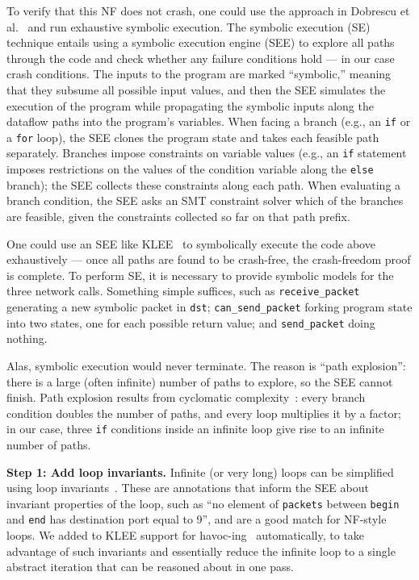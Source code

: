 \documentclass[letterpaper,twocolumn,10pt]{article}
\newcommand{\code}[1]{\lstinline{#1}}
\begin{document}
To verify that this NF does not crash, one could use the approach in Dobrescu et al.~\cite{dobrescu2014software} and run exhaustive symbolic execution. The symbolic execution (SE) technique entails using a symbolic execution engine (SEE) to explore all paths through the code and check whether any failure conditions hold --- in our case crash conditions. The inputs to the program are marked ``symbolic,'' meaning that they subsume all possible input values, and then the SEE simulates the execution of the program while propagating the symbolic inputs along the dataflow paths into the program's variables. When facing a branch (e.g., an \code{if} or a \code{for} loop), the SEE clones the program state and takes each feasible path separately. Branches impose constraints on variable values (e.g., an \code{if} statement imposes restrictions on the values of the condition variable along the \code{else} branch); the SEE collects these constraints along each path. When evaluating a branch condition, the SEE asks an SMT constraint solver which of the branches are feasible, given the constraints collected so far on that path prefix.

One could use an SEE like KLEE~\cite{cadar2008klee} to symbolically execute the code above exhaustively --- once all paths are found to be crash-free, the crash-freedom proof is complete. To perform SE, it is necessary to provide symbolic models for the three network calls. Something simple suffices, such as \code{receive_packet} generating a new symbolic packet in \code{dst}; \code{can_send_packet} forking program state into two states, one for each possible return value; and \code{send_packet} doing nothing. 

Alas, symbolic execution would never terminate. The reason is ``path explosion'': there is a large (often infinite) number of paths to explore, so the SEE cannot finish.  Path explosion results from cyclomatic complexity~\cite{mccabe:cyclomatic}: every branch condition doubles the number of paths, and every loop multiplies it by a factor; in our case, three \code{if} conditions inside an infinite loop give rise to an infinite number of paths. 

{\bf Step 1: Add loop invariants.} Infinite (or very long) loops can be simplified using loop invariants~\cite[\S~2.1]{cormen2009introduction}. These are annotations that inform the SEE about invariant properties of the loop, such as ``no element of \code{packets} between \code{begin} and \code{end} has destination port equal to 9'', and are a good match for NF-style loops.  We added to KLEE support for havoc-ing~\cite{barnett2005boogie} automatically, to take advantage of such invariants and essentially reduce the infinite loop to a single abstract iteration that can be reasoned about in one pass.
 
\end{document}
